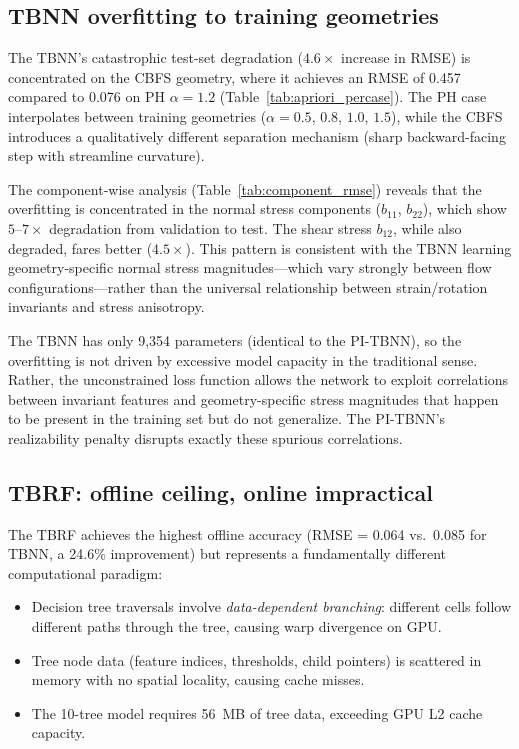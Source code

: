 \subsection{TBNN overfitting to training geometries}

The TBNN's catastrophic test-set degradation ($4.6\times$ increase in RMSE) is concentrated on the CBFS geometry, where it achieves an RMSE of 0.457 compared to 0.076 on PH $\alpha=1.2$ (Table~\ref{tab:apriori_percase}).
The PH case interpolates between training geometries ($\alpha=0.5$, $0.8$, $1.0$, $1.5$), while the CBFS introduces a qualitatively different separation mechanism (sharp backward-facing step with streamline curvature).

The component-wise analysis (Table~\ref{tab:component_rmse}) reveals that the overfitting is concentrated in the normal stress components ($b_{11}$, $b_{22}$), which show $5$--$7\times$ degradation from validation to test.
The shear stress $b_{12}$, while also degraded, fares better ($4.5\times$).
This pattern is consistent with the TBNN learning geometry-specific normal stress magnitudes---which vary strongly between flow configurations---rather than the universal relationship between strain/rotation invariants and stress anisotropy.

The TBNN has only 9,354 parameters (identical to the PI-TBNN), so the overfitting is not driven by excessive model capacity in the traditional sense.
Rather, the unconstrained loss function allows the network to exploit correlations between invariant features and geometry-specific stress magnitudes that happen to be present in the training set but do not generalize.
The PI-TBNN's realizability penalty disrupts exactly these spurious correlations.

\subsection{TBRF: offline ceiling, online impractical}

The TBRF achieves the highest offline accuracy (RMSE = 0.064 vs.\ 0.085 for TBNN, a 24.6\% improvement) but represents a fundamentally different computational paradigm:
\begin{itemize}
    \item Decision tree traversals involve \emph{data-dependent branching}: different cells follow different paths through the tree, causing warp divergence on GPU.
    \item Tree node data (feature indices, thresholds, child pointers) is scattered in memory with no spatial locality, causing cache misses.
    \item The 10-tree model requires \SI{56}{MB} of tree data, exceeding GPU L2 cache capacity.
\end{itemize}

